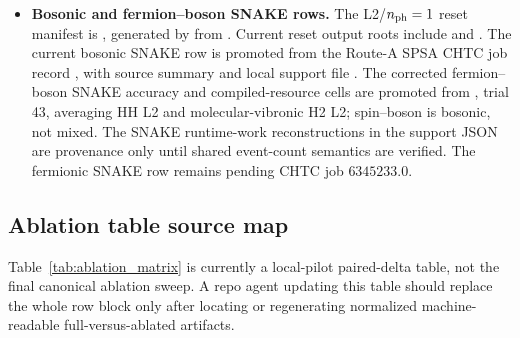 \documentclass[
  reprint,
  amsmath,
  amssymb,
  aps,
  pra,
  nofootinbib,
  superscriptaddress,
  floatfix
]{revtex4-2}
\begin{document}
\begin{itemize}
\item \textbf{Bosonic and fermion--boson SNAKE rows.} The L2/$n_{\rm ph}=1$ reset manifest is , generated by  from . Current reset output roots include  and . The current bosonic SNAKE row is promoted from the Route-A SPSA CHTC job record , with source summary  and local support file . The corrected fermion--boson SNAKE accuracy and compiled-resource cells are promoted from , trial 43, averaging HH L2 and molecular-vibronic H2 L2; spin--boson is bosonic, not mixed. The SNAKE runtime-work reconstructions in the support JSON are provenance only until shared event-count semantics are verified. The fermionic SNAKE row remains pending CHTC job $6345233.0$.
\end{itemize}

\subsection{Ablation table source map}
\label{app:table_ii_source_map}

Table~\ref{tab:ablation_matrix} is currently a local-pilot paired-delta table, not the final canonical ablation sweep. A repo agent updating this table should replace the whole row block only after locating or regenerating normalized machine-readable full-versus-ablated artifacts.
\end{document}
